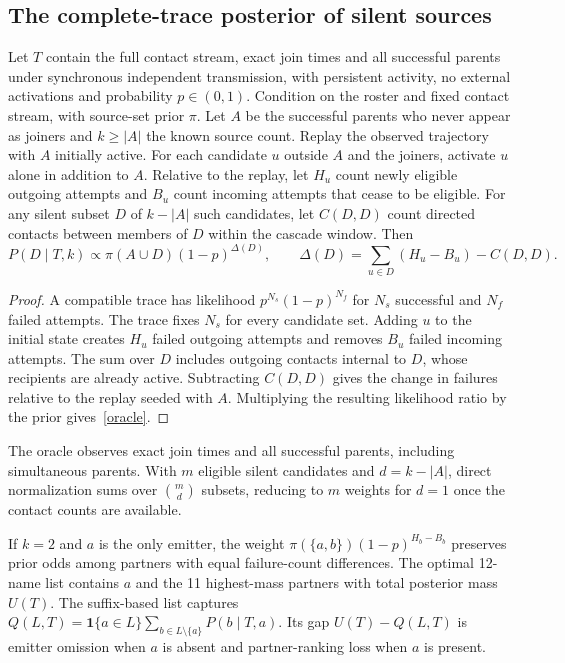 \documentclass[a4paper,runningheads]{llncs}
\begin{document}
\begin{samepage}
\subsection{The complete-trace posterior of silent sources}
\begin{proposition}
\label{prop:oracle}
Let $T$ contain the full contact stream, exact join times and all successful parents under synchronous independent transmission, with persistent activity, no external activations and probability $p\in(0,1)$. Condition on the roster and fixed contact stream, with source-set prior $\pi$. Let $A$ be the successful parents who never appear as joiners and $k\geq|A|$ the known source count. Replay the observed trajectory with $A$ initially active. For each candidate $u$ outside $A$ and the joiners, activate $u$ alone in addition to $A$. Relative to the replay, let $H_u$ count newly eligible outgoing attempts and $B_u$ count incoming attempts that cease to be eligible. For any silent subset $D$ of $k-|A|$ such candidates, let $C(D,D)$ count directed contacts between members of $D$ within the cascade window. Then
\begin{equation}
 P(D\mid T,k)\propto\pi(A\cup D)(1-p)^{\Delta(D)},\qquad
 \Delta(D)=\sum_{u\in D}(H_u-B_u)-C(D,D).
 \label{oracle}
\end{equation}
\end{proposition}
\end{samepage}
\begin{proof}
A compatible trace has likelihood $p^{N_s}(1-p)^{N_f}$ for $N_s$ successful and $N_f$ failed attempts. The trace fixes $N_s$ for every candidate set. Adding $u$ to the initial state creates $H_u$ failed outgoing attempts and removes $B_u$ failed incoming attempts. The sum over $D$ includes outgoing contacts internal to $D$, whose recipients are already active. Subtracting $C(D,D)$ gives the change in failures relative to the replay seeded with $A$. Multiplying the resulting likelihood ratio by the prior gives~\eqref{oracle}.
\end{proof}

The oracle observes exact join times and all successful parents, including simultaneous parents. With $m$ eligible silent candidates and $d=k-|A|$, direct normalization sums over $\binom{m}{d}$ subsets, reducing to $m$ weights for $d=1$ once the contact counts are available.

If $k=2$ and $a$ is the only emitter, the weight $\pi(\{a,b\})(1-p)^{H_b-B_b}$ preserves prior odds among partners with equal failure-count differences. The optimal 12-name list contains $a$ and the 11 highest-mass partners with total posterior mass $U(T)$. The suffix-based list captures $Q(L,T)=\mathbf{1}\{a\in L\}\sum_{b\in L\setminus\{a\}}P(b\mid T,a)$. Its gap $U(T)-Q(L,T)$ is emitter omission when $a$ is absent and partner-ranking loss when $a$ is present.


\par
\begingroup
{}
\renewcommand{\doi}[1]{%
  \href{https://doi.org/\detokenize{#1}}{\mbox{\nolinkurl{https://doi.org/#1}}}%
}
\raggedright


\endgroup
\end{document}
